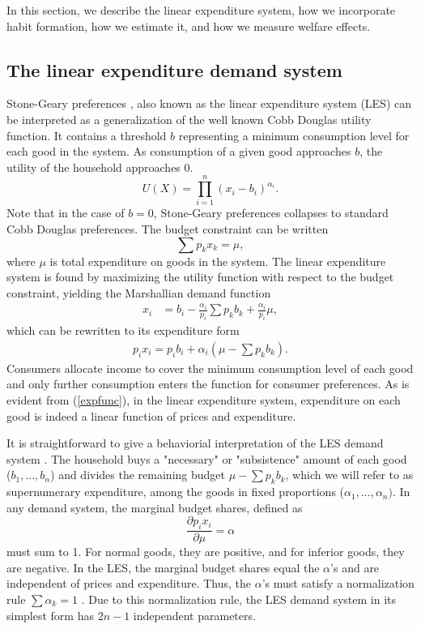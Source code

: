 In this section, we describe the linear expenditure system, how we incorporate habit formation, how we estimate it, and how we measure welfare effects.

\subsection{The linear expenditure demand system}\label{LESintro}
Stone-Geary preferences \citep{stone1954linear,geary1950note}, also known as the linear expenditure system (LES) can be interpreted as a generalization of the well known Cobb Douglas utility function. It contains a threshold $b$ representing a minimum consumption level for each good in the system. As consumption of a given good approaches $b$, the utility of the household approaches $0$. 
\begin{equation}
U(X)=\prod_{i=1}^n (x_i-b_i)^{\alpha_i}.
\end{equation}
Note that in the case of $b=0$, Stone-Geary preferences collapses to standard Cobb Douglas preferences. The budget constraint can be written 
\begin{equation}
    \sum p_k x_k = \mu,
\end{equation}
where $\mu$ is total expenditure on goods in the system. The linear expenditure system is found by maximizing the utility function with respect to the budget constraint, yielding the Marshallian demand function
\begin{align}
    x_i &= b_i - \frac{\alpha_i}{p_i} \sum p_k b_k + \frac{\alpha_i}{p_i} \mu,
\end{align}
which can be rewritten to its expenditure form
\begin{align}\label{expfunc}
    p_i x_i = p_i b_i + \alpha_i(\mu - \sum p_k b_k).
\end{align}
Consumers allocate income to cover the minimum consumption level of each good and only further consumption enters the function for consumer preferences. As is evident from (\ref{expfunc}), in the linear expenditure system, expenditure on each good is indeed a linear function of prices and expenditure.

It is straightforward to give a behaviorial interpretation of the LES demand system \citep{pollak1992demand}. The household buys a "necessary" or "subsistence" amount of each good ($b_1,...,b_n$) and divides the remaining budget $\mu - \sum p_k b_k$, which we will refer to as supernumerary expenditure, among the goods in fixed proportions ($\alpha_1,...,\alpha_n)$. In any demand system, the marginal budget shares, defined as
\begin{equation}
    \frac{\partial p_i x_i}{\partial \mu} = \alpha
\end{equation}
must sum to 1. For normal goods, they are positive, and for inferior goods, they are negative. In the LES, the marginal budget shares equal the $\alpha$'s and are independent of prices and expenditure. 
Thus, the $\alpha$'s must satisfy a normalization rule $\sum \alpha_k=1$ \citep{pollak1992demand}. Due to this normalization rule, the LES demand system in its simplest form has $2n-1$ independent parameters.

